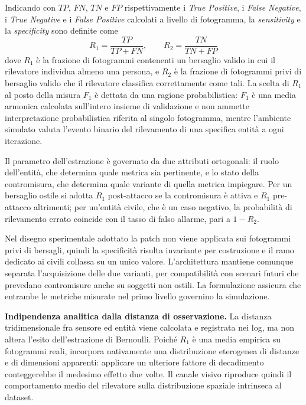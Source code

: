 \documentclass[a4paper,12pt]{report}
\begin{document}
Indicando con $\mathit{TP}$, $\mathit{FN}$, $\mathit{TN}$ e $\mathit{FP}$
rispettivamente i \textit{True Positive}, i \textit{False Negative}, i
\textit{True Negative} e i \textit{False Positive} calcolati a livello di
fotogramma, la \textit{sensitivity} e la \textit{specificity} sono definite come
\begin{equation}
    R_1 = \frac{\mathit{TP}}{\mathit{TP} + \mathit{FN}}, \qquad
    R_2 = \frac{\mathit{TN}}{\mathit{TN} + \mathit{FP}}
    \label{eq:r1_r2}
\end{equation}
dove $R_1$ è la frazione di fotogrammi contenenti un bersaglio valido in cui il
rilevatore individua almeno una persona, e $R_2$ è la frazione di fotogrammi
privi di bersaglio valido che il rilevatore classifica correttamente come tali.
La scelta di $R_1$ al posto della misura $F_1$ è dettata da una ragione
probabilistica: $F_1$ è una media armonica calcolata sull'intero insieme di
validazione e non ammette interpretazione probabilistica riferita al singolo
fotogramma, mentre l'ambiente simulato valuta l'evento binario del rilevamento
di una specifica entità a ogni iterazione.

Il parametro dell'estrazione è governato da due attributi ortogonali: il ruolo
dell'entità, che determina quale metrica sia pertinente, e lo stato della
contromisura, che determina quale variante di quella metrica impiegare. Per un
bersaglio ostile si adotta $R_1$ post-attacco se la contromisura è attiva e
$R_1$ pre-attacco altrimenti; per un'entità civile, che è un caso
negativo, la probabilità di rilevamento errato coincide con il tasso di falso
allarme, pari a $1 - R_2$.

Nel disegno sperimentale adottato la patch non viene applicata sui fotogrammi
privi di bersagli, quindi la specificità risulta invariante per costruzione e il
ramo dedicato ai civili collassa su un unico valore. L'architettura mantiene
comunque separata l'acquisizione delle due varianti, per compatibilità con
scenari futuri che prevedano contromisure anche su soggetti non ostili. La
formulazione assicura che entrambe le metriche misurate nel primo livello
governino la simulazione.

\textbf{Indipendenza analitica dalla distanza di osservazione.}
La distanza tridimensionale fra sensore ed entità viene calcolata e registrata
nei log, ma non altera l'esito dell'estrazione di Bernoulli. Poiché $R_1$ è una
media empirica su fotogrammi reali, incorpora nativamente una distribuzione
eterogenea di distanze e di dimensioni apparenti: applicare un ulteriore fattore
di decadimento conteggerebbe il medesimo effetto due volte. Il canale visivo
riproduce quindi il comportamento medio del rilevatore sulla distribuzione
spaziale intrinseca al dataset.
\end{document}

